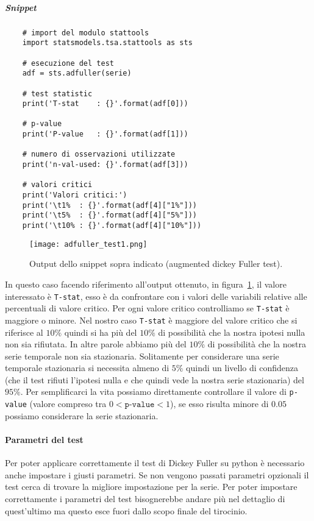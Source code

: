 \subparagraph*{Snippet}
\begin{verbatim}
    # import del modulo stattools
    import statsmodels.tsa.stattools as sts

    # esecuzione del test
    adf = sts.adfuller(serie)

    # test statistic
    print('T-stat    : {}'.format(adf[0]))

    # p-value
    print('P-value   : {}'.format(adf[1]))

    # numero di osservazioni utilizzate
    print('n-val-used: {}'.format(adf[3]))

    # valori critici
    print('Valori critici:')
    print('\t1%  : {}'.format(adf[4]["1%"]))
    print('\t5%  : {}'.format(adf[4]["5%"]))
    print('\t10% : {}'.format(adf[4]["10%"]))
\end{verbatim}


\begin{figure}[H]
    \centering
    \texttt{[image: adfuller\_test1.png]}
    \caption{Output dello snippet sopra indicato (augmented dickey Fuller test).}
    \label{fig:adft_out_ns}
\end{figure}

In questo caso facendo riferimento all'output ottenuto, in figura~\ref{fig:adft_out_ns},
il valore interessato è \texttt{T-stat}, esso è da confrontare con i valori delle variabili
relative alle percentuali di valore critico. Per ogni valore critico controlliamo se
\texttt{T-stat} è maggiore o minore. Nel nostro caso \texttt{T-stat} è maggiore del valore critico
che si riferisce al $10\%$ quindi si ha più del $10\%$ di possibilità che la nostra ipotesi nulla
non sia rifiutata. In altre parole abbiamo più del $10\%$ di possibilità che la nostra
serie temporale non sia stazionaria. Solitamente per considerare una serie temporale 
stazionaria si necessita almeno di $5\%$ quindi un livello di confidenza (che il test rifiuti
l'ipotesi nulla e che quindi vede la nostra serie stazionaria) del $95\%$.
Per semplificarci la vita possiamo direttamente controllare il valore di \texttt{p-value}
(valore compreso tra $0 < \texttt{p-value} < 1$), se esso risulta minore di $0.05$ possiamo considerare
la serie stazionaria.

\paragraph*{Parametri del test}
Per poter applicare correttamente il test di Dickey Fuller su python è necessario
anche impostare i giusti parametri. Se non vengono passati parametri opzionali
il test cerca di trovare la migliore impostazione per la serie. Per poter impostare 
correttamente i parametri del test bisognerebbe andare più nel dettaglio di quest'ultimo 
ma questo esce fuori dallo scopo finale del tirocinio.

